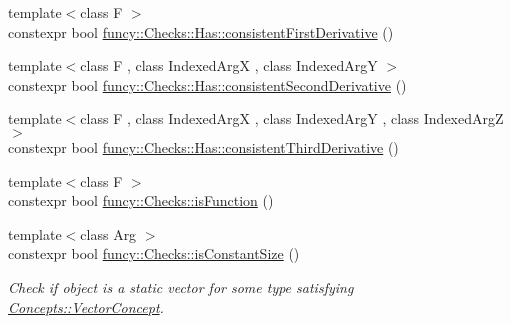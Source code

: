 \begin{DoxyCompactItemize}
{\footnotesize template$<$class F $>$ }\\constexpr bool \hyperlink{namespacefuncy_1_1Checks_1_1Has_a8bf7f5a59024cc8321ea379fed648ea7}{funcy\-::\-Checks\-::\-Has\-::consistent\-First\-Derivative} ()
\item 
{\footnotesize template$<$class F , class Indexed\-Arg\-X , class Indexed\-Arg\-Y $>$ }\\constexpr bool \hyperlink{namespacefuncy_1_1Checks_1_1Has_ae07f080937ba3cd627721ddd8244b831}{funcy\-::\-Checks\-::\-Has\-::consistent\-Second\-Derivative} ()
\item 
{\footnotesize template$<$class F , class Indexed\-Arg\-X , class Indexed\-Arg\-Y , class Indexed\-Arg\-Z $>$ }\\constexpr bool \hyperlink{namespacefuncy_1_1Checks_1_1Has_ad741287e889ee6f44913d60789c3e8b0}{funcy\-::\-Checks\-::\-Has\-::consistent\-Third\-Derivative} ()
\item 
{\footnotesize template$<$class F $>$ }\\constexpr bool \hyperlink{group__ConceptGroup_ga174e2d9fe934ee3184d9c656b219d754}{funcy\-::\-Checks\-::is\-Function} ()
\item 
{\footnotesize template$<$class Arg $>$ }\\constexpr bool \hyperlink{group__ConceptGroup_ga84efea3afd51e9db8be11ee2a5335c98}{funcy\-::\-Checks\-::is\-Constant\-Size} ()
\begin{DoxyCompactList}\small\item\em Check if object is a static vector for some type satisfying \hyperlink{structfuncy_1_1Concepts_1_1VectorConcept}{Concepts\-::\-Vector\-Concept}. \end{DoxyCompactList}\end{DoxyCompactItemize}
